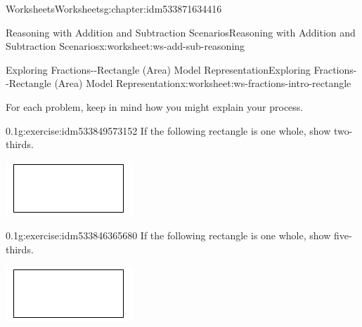 \documentclass[twoside,11pt,]{book}
\begin{document}
\begin{chapterptx}{Worksheets}{}{Worksheets}{}{}{g:chapter:idm533871634416}
\begin{worksheet-section-numberless}{Reasoning with Addition and Subtraction Scenarios}{}{Reasoning with Addition and Subtraction Scenarios}{}{}{x:worksheet:ws-add-sub-reasoning}
\end{worksheet-section-numberless}
\restoregeometry
%
%
\typeout{************************************************}
\typeout{************************************************}
%
\begin{worksheet-section-numberless}{Exploring Fractions-{}-{}Rectangle (Area) Model Representation}{}{Exploring Fractions-{}-{}Rectangle (Area) Model Representation}{}{}{x:worksheet:ws-fractions-intro-rectangle}
\begin{introduction}{}%
For each problem, keep in mind how you might explain your process.%
\end{introduction}%
\begin{divisionexercise}{1}{}{0.1}{g:exercise:idm533849573152}%
If the following rectangle is one whole, show two-thirds. \begin{sidebyside}{1}{0.3}{0.3}{0}%
\begin{sbspanel}{0.4}%
\includegraphics[width=1\linewidth]{images/generic-rectangle.png}
\end{sbspanel}%
\end{sidebyside}%
%
\end{divisionexercise}%
\begin{divisionexercise}{2}{}{0.1}{g:exercise:idm533846365680}%
If the following rectangle is one whole, show five-thirds. \begin{sidebyside}{1}{0.3}{0.3}{0}%
\begin{sbspanel}{0.4}%
\includegraphics[width=1\linewidth]{images/generic-rectangle.png}

\end{sbspanel}
\end{sidebyside}
\end{divisionexercise}
\end{worksheet-section-numberless}
\end{chapterptx}
\end{document}

